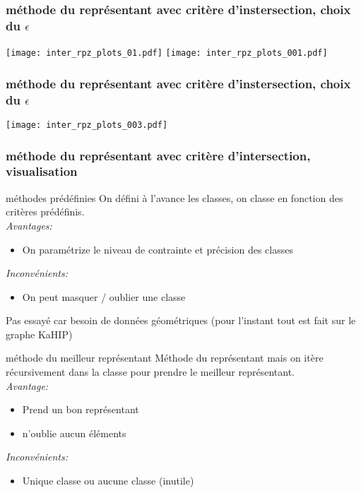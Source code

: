 \documentclass[aspectratio=169]{beamer}
\begin{document}
    \begin{frame}
        \frametitle{méthode du représentant avec critère d'instersection, choix du $\epsilon$}
        \texttt{[image: inter\_rpz\_plots\_01.pdf]}
        \texttt{[image: inter\_rpz\_plots\_001.pdf]}
    \end{frame}

    \begin{frame}
        \frametitle{méthode du représentant avec critère d'instersection, choix du $\epsilon$}
        \begin{center}
            \texttt{[image: inter\_rpz\_plots\_003.pdf]}
        \end{center}
    \end{frame}
    \begin{frame}
        \frametitle{méthode du représentant avec critère d'intersection, visualisation}
    
    
    \end{frame}
    \begin{frame}{méthodes prédéfinies}
        On défini à l'avance les classes, on classe en fonction des critères prédéfinis.\\
        \emph{Avantages:}
        \begin{itemize}
            \item On paramétrize le niveau de contrainte et précision des classes
        \end{itemize}
        \emph{Inconvénients:}
        \begin{itemize}
            \item On peut masquer / oublier une classe
        \end{itemize}

        Pas essayé car besoin de données géométriques (pour l'instant tout est fait sur le graphe KaHIP)
    \end{frame}

    \begin{frame}{méthode du meilleur représentant}
        Méthode du représentant mais on itère récursivement dans la classe pour prendre le meilleur représentant.\\
        \vspace*{5pt}
        \emph{Avantage:}
        \begin{itemize}
            \item Prend un bon représentant
            \item n'oublie aucun éléments
        \end{itemize}
        \emph{Inconvénients:}
        \begin{itemize}
            \item Unique classe ou aucune classe (inutile)
        \end{itemize}
    \end{frame}
\end{document}
